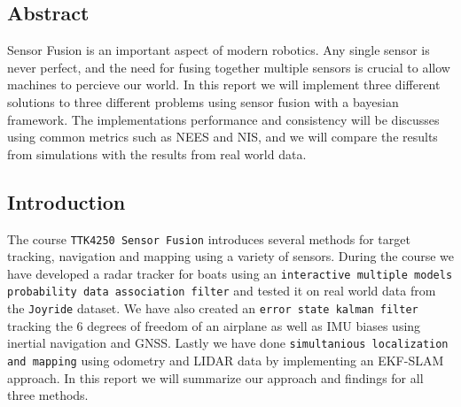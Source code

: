 \subsection{Abstract}
Sensor Fusion is an important aspect of modern robotics. Any single sensor is never perfect, and the need for fusing together multiple sensors is crucial to allow machines to percieve our world. In this report we will implement three different solutions to three different problems using sensor fusion with a bayesian framework. The implementations performance and consistency will be discusses using common metrics such as NEES and NIS, and we will compare the results from simulations with the results from real world data.
\subsection{Introduction}
The course \texttt{TTK4250 Sensor Fusion} introduces several methods for target tracking, navigation and mapping using a variety of sensors. During the course we have developed a radar tracker for boats using an \texttt{interactive multiple models probability data association filter} and tested it on real world data from the \texttt{Joyride} dataset. We have also created an \texttt{error state kalman filter} tracking the 6 degrees of freedom of an airplane as well as IMU biases using inertial navigation and GNSS. Lastly we have done \texttt{simultanious localization and mapping} using odometry and LIDAR data by implementing an EKF-SLAM approach. In this report we will summarize our approach and findings for all three methods.
